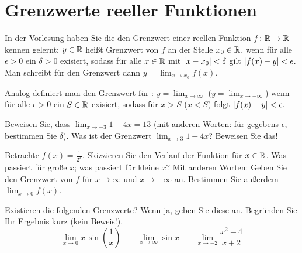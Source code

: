 \documentclass{scrartcl}
\begin{document}
\section{Grenzwerte reeller Funktionen }
In der Vorlesung haben Sie die den Grenzwert einer reellen Funktion $f\colon \mathbb{R} \to \mathbb{R}$ kennen gelernt:
$y \in \mathbb{R}$ heißt Grenzwert von $f$ an der Stelle $x_0 \in \mathbb{R}$, wenn für alle $\epsilon > 0$ ein $\delta > 0$ exisiert, sodass für alle $x \in \mathbb{R}$ mit $\left\vert x - x_0 \right\vert < \delta$ gilt $\left\vert f(x) - y \right\vert < \epsilon$.
Man schreibt für den Grenzwert dann $y = \lim_{x \to x_0} f(x)$.

Analog definiert man den Grenzwert für : 
$y = \lim_{x \to \infty}$ ($y = \lim_{x \to -\infty}$) wenn für alle $\epsilon > 0$ ein $S \in \mathbb{R}$ exisiert, sodass für $x > S$ ($x < S$) folgt $\left\vert f(x) - y \right\vert < \epsilon$. 

\begin{subex}
  \item{} Beweisen Sie, dass $\lim_{x \to -3} 1 - 4x = 13$ (mit anderen Worten: für gegebens $\epsilon$, bestimmen Sie $\delta$).
  Was ist der Grenzwert $\lim_{x \to 3} 1 - 4x$?
  Beweisen Sie das!
  \item{} Betrachte $f(x) = \frac{1}{2^x}$.
  Skizzieren Sie den Verlauf der Funktion für $x \in \mathbb{R}$.
  Was passiert für große $x$; was passiert für kleine $x$?
  Mit anderen Worten: Geben Sie den Grenzwert von $f$ für $x \to \infty$ und $x \to -\infty$ an.
  Bestimmen Sie außerdem $\lim_{x \to 0} f(x)$.
  \item{} Existieren die folgenden Grenzwerte? 
  Wenn ja, geben Sie diese an.
  Begründen Sie Ihr Ergebnis kurz (kein Beweis!).
  \[
    \lim_{x \to 0} x \, \sin \left( \frac{1}{x} \right)  \quad\quad
    \lim_{x \to \infty} \sin x  \quad\quad 
    \lim_{x \to -2} \frac{x^2 - 4}{x + 2}
  \]
\end{subex}
\end{document}
